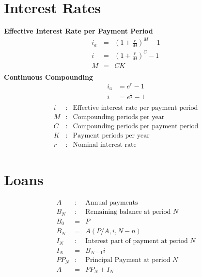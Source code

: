 \documentclass[landscape, letterpaper, 10pt]{article}
\begin{document}
\begin{multicols}{3}
    \section*{Interest Rates}
    \textbf{Effective Interest Rate per Payment Period}
    \begin{align*}
        i_a & = & \left(1+\frac{r}{M}\right)^M -1 \\
        i   & = & \left(1+\frac{r}{M}\right)^C -1 \\
        M   & = & CK                              \\
    \end{align*}
    \textbf{Continuous Compounding}
    \begin{align*}
        i_a & = e^r - 1           \\
        i   & = e^\frac{r}{k} - 1 \\
    \end{align*}
    \begin{align*}
        i & : & \text{Effective interest rate per payment period} \\
        M & : & \text{Compounding periods per year}               \\
        C & : & \text{Compounding periods per payment period}     \\
        K & : & \text{Payment periods per year}                   \\
        r & : & \text{Nominal interest rate}                      \\
    \end{align*}
    \section*{Loans}
    \begin{align*}
        A    & : & \text{Annual payments}                       \\
        B_N  & : & \text{Remaining balance at period } N        \\
        B_0  & = & P                                            \\
        B_N  & = & A(P/A, i, N-n)                               \\
        I_N  & : & \text{Interest part of payment at period } N \\
        I_N  & = & B_{N-1} i                                    \\
        PP_N & : & \text{Principal Payment at period } N        \\
        A    & = & PP_N + I_N                                   \\
    \end{align*}

\end{multicols}
\end{document}
